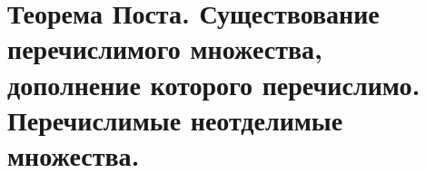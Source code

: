\section{Теорема Поста. Существование перечислимого множества, дополнение которого перечислимо. Перечислимые неотделимые множества.}